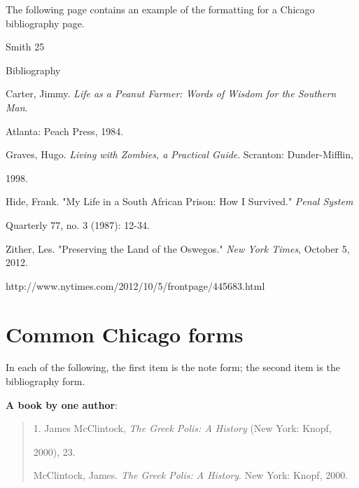 The following page contains an example of the formatting for a Chicago bibliography 
page.
\newpage





\thispagestyle{empty}
\thispagestyle{empty}
\begin{flushright}Smith 25\end{flushright}
\begin{center}Bibliography\end{center}

Carter, Jimmy. \emph{Life as a Peanut Farmer: Words of Wisdom for the Southern Man}. 

\hspace{.4in}Atlanta: Peach Press, 1984.

Graves, Hugo. \emph{Living with Zombies, a Practical Guide}. Scranton: Dunder-Mifflin,

\hspace{.4in}1998.

Hide, Frank. "My Life in a South African Prison: How I Survived." \emph{Penal System}

\hspace{.4in}Quarterly 77, no. 3 (1987): 12-34.

Zither, Les. "Preserving the Land of the Oswegos." \emph{New York Times}, October 5,
2012. 

\hspace{.4in}http://www.nytimes.com/2012/10/5/frontpage/445683.html



\newpage




\section{Common Chicago forms}

In each of the following, the first item is the note form; the second item is the 
bibliography form.
	 	 	
\textbf{A book by one author}:

\begin{quote}
 \hspace{.4in}1. James McClintock, \emph{The Greek Polis: A History} (New York: Knopf,

2000), 23.

\medskip

McClintock, James. \emph{The Greek Polis: A History}. New York: Knopf,  2000.
\end{quote}


